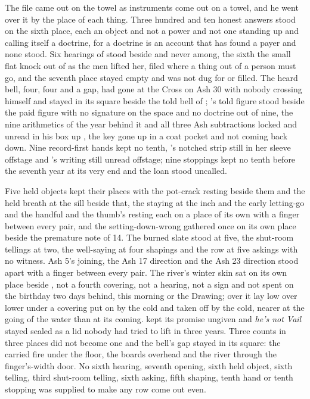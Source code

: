 \scenebreak

The file came out on the towel as instruments come out on a towel, and he went over it by the place of each thing. Three hundred and ten honest answers stood on the sixth place, each an object and not a power and not one standing up and calling itself a doctrine, for a doctrine is an account that has found a payer and none stood. Six hearings of  stood beside and never among, the sixth the small flat knock out of  as the men lifted her, filed where a thing out of a person must go, and the seventh place stayed empty and was not dug for or filled. The heard bell, four, four and a gap, had gone at the Cross on Ash 30 with nobody crossing himself and stayed in its square beside the told bell of ; 's told figure stood beside the paid figure with no signature on the space and no doctrine out of nine, the nine arithmetics of the year behind it and all three Ash subtractions locked and unread in his box up , the key gone up in a coat pocket and not coming back down. Nine record-first hands kept no tenth, 's notched strip still in her sleeve offstage and 's writing still unread offstage; nine stoppings kept no tenth before the seventh year at its very end and the loan stood uncalled.

Five held objects kept their places with the pot-crack resting beside them and the held breath at the sill beside that, the staying at the inch and the early letting-go and the handful and the thumb's resting each on a place of its own with a finger between every pair, and the setting-down-wrong gathered once on its own place beside the premature note of  14. The burned slate stood at five, the shut-room tellings at two, the well-saying at four shapings and the row at five askings with no witness. Ash 5's joining, the Ash 17 direction and the Ash 23 direction stood apart with a finger between every pair. The river's winter skin sat on its own place beside , not a fourth covering, not a hearing, not a sign and not spent on the birthday two days behind, this morning or the Drawing; over  it lay low over lower under a covering put on by the cold and taken off by the cold, nearer at the going of the water than at its coming.  kept its promise ungiven and \emph{he's not Vail} stayed sealed as a lid nobody had tried to lift in three years. Three counts in three places did not become one and the bell's gap stayed in its square: the carried fire under the floor, the boards overhead and the river through the finger's-width door. No sixth hearing, seventh opening, sixth held object, sixth telling, third shut-room telling, sixth asking, fifth shaping, tenth hand or tenth stopping was supplied to make any row come out even.

